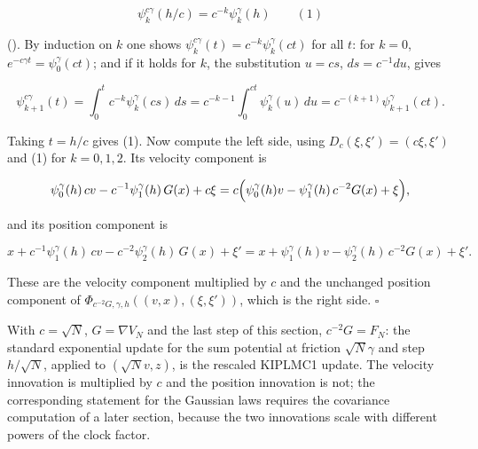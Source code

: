 \documentclass[11pt,a4paper]{article}
\begin{document}
\[\psi^{c\gamma}_k(h/c)=c^{-k}\psi^\gamma_k(h)\qquad(1)\]


(\cite[Section~3.10.3]{LangevinLean2026Kinetic}). By induction on \(k\) one shows \(\psi^{c\gamma}_k(t)=c^{-k}\psi^\gamma_k(ct)\) for all \(t\): for \(k=0\), \(e^{-c\gamma t}=\psi^\gamma_0(ct)\); and if it holds for \(k\), the substitution \(u=cs\), \(ds=c^{-1}du\), gives


\[\psi^{c\gamma}_{k+1}(t)=\int_0^tc^{-k}\psi^\gamma_k(cs)\,ds=c^{-k-1}\int_0^{ct}\psi^\gamma_k(u)\,du=c^{-(k+1)}\psi^\gamma_{k+1}(ct).\]


Taking \(t=h/c\) gives (1). Now compute the left side, using \(D_c(\xi,\xi')=(c\xi,\xi')\) and (1) for \(k=0,1,2\). Its velocity component is


\[\psi^\gamma_0(h)\,cv-c^{-1}\psi^\gamma_1(h)\,G(x)+c\xi=c\Bigl(\psi^\gamma_0(h)v-\psi^\gamma_1(h)\,c^{-2}G(x)+\xi\Bigr),\]


and its position component is


\[x+c^{-1}\psi^\gamma_1(h)\,cv-c^{-2}\psi^\gamma_2(h)\,G(x)+\xi'=x+\psi^\gamma_1(h)v-\psi^\gamma_2(h)\,c^{-2}G(x)+\xi'.\]


These are the velocity component multiplied by \(c\) and the unchanged position component of \(\Phi_{c^{-2}G,\gamma,h}((v,x),(\xi,\xi'))\), which is the right side. \(\square\)




With \(c=\sqrt N\), \(G=\nabla V_N\) and the last step of this section, \(c^{-2}G=F_N\): the standard exponential update for the sum potential at friction \(\sqrt N\gamma\) and step \(h/\sqrt N\), applied to \((\sqrt Nv,z)\), is the rescaled KIPLMC1 update. The velocity innovation is multiplied by \(c\) and the position innovation is not; the corresponding statement for the Gaussian laws requires the covariance computation of a later section, because the two innovations scale with different powers of the clock factor.
\end{document}
